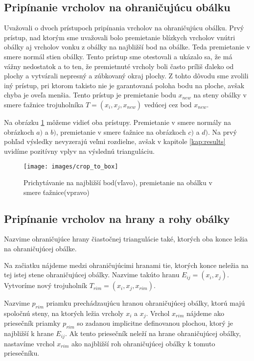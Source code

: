 \subsection{Pripínanie vrcholov na ohraničujúcu obálku}

Uvažovali o dvoch prístupoch pripínania vrcholov na ohraničujúcu obálku.
Prvý prístup, nad ktorým sme uvažovali bolo premietanie blízkych vrcholov vnútri obálky aj 
vrcholov vonku z obálky na najbližší bod na obálke. Teda premietanie v smere normál stien obálky.
Tento prístup sme otestovali a ukázalo sa, že má vážny nedostatok a to ten, že premietnuté 
vrcholy boli často príliš ďaleko od plochy a vytvárali nepresný a zúbkovaný okraj plochy. 
Z tohto dôvodu
sme zvolili iný prístup, pri ktorom takisto nie je garantovaná poloha bodu na ploche, avšak 
chyba je oveľa menšia. Tento prístup je premietanie bodu $x_{new}$ na steny obálky v smere 
ťažnice trojuholníka $T = (x_i, x_j, x_{new})$ vedúcej cez bod $x_{new}$.

Na obrázku \ref{obr:crop_to_box} môžeme vidieť oba prístupy. Premietanie v smere normály 
na obrázkoch $a)$ a $b)$, premietanie v smere ťažnice na obrázkoch $c)$ a $d)$. Na prvý pohľad 
výsledky nevyzerajú veľmi rozdielne, avšak v kapitole \ref{kap:results} uvidíme pozitívny vplyv 
na výslednú trianguláciu. 
        
\begin{figure}
    \centerline{\texttt{[image: images/crop\_to\_box]}}
    \caption[Orezávanie na ohraničujúcu obálku]
    {Prichytávanie na najbližší bod(vľavo), premietanie na obálku v smere ťažnice(vpravo)}
    \label{obr:crop_to_box}
\end{figure}

\subsection{Pripínanie vrcholov na hrany a rohy obálky}

Nazvime ohraničujúce hrany čiastočnej triangulácie také, ktorých oba konce ležia na ohraničujúcej obálke.
                
Na začiatku nájdeme medzi ohraničujúcimi hranami tie, ktorých konce neležia
na tej istej stene ohraničujúcej obálky. 
Nazvime takúto hranu $E_{ij} = (x_i, x_j)$. Vytvoríme nový trojuholník 
$T_{rim} = (x_i, x_j, x_{rim})$. 

Nazvime $p_{rim}$ priamku prechádzaujúcu 
hranou ohraničujúcej obálky, ktorú majú spoločnú steny, na ktorých ležia 
vrcholy $x_i$ a $x_j$. Vrchol $x_{rim}$ nájdeme ako priesečník priamky $p_{rim}$ 
so zadanou implicitne definovanou plochou, ktorý je najbližší k hrane $E_{ij}$. 
Ak tento priesečník neleží na hrane ohraničujúcej obálky, nastavíme vrchol $x_{rim}$ 
ako najbližší roh ohraničujúcej obálky k tomuto priesečníku.

